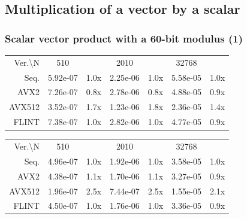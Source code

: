 \documentclass[10pt]{beamer}
\begin{document}
\subsection{Multiplication of a vector by a scalar}
\begin{frame}
    \frametitle{Scalar vector product with a 60-bit modulus (1)}

    \begin{table}[h!]
        \centering
        
        \begin{tabular}{|r|*{3}{c c|}}
            \hline
            \rowcolor{myGray} 
            \multicolumn{7}{|c|}{\textsc{Cascade Lake}} \\
    
            \hline
            \rowcolor{myGray}
            Ver.\textbackslash N & 510 & & 2010 & & 32768 & \\
            \hline
            \cellcolor{myGray} Seq. & 5.92e-07 & 1.0x & 2.25e-06 & 1.0x & 5.58e-05 & 1.0x \\
            \hline
            \cellcolor{myGray} AVX2 & 7.26e-07 & 0.8x & 2.78e-06 & 0.8x & 4.88e-05 & 0.9x \\
            \hline
            \cellcolor{myGray} AVX512 & 3.52e-07 & 1.7x & 1.23e-06 & 1.8x & 2.36e-05 & 1.4x \\
            \hline
            \cellcolor{myGray} FLINT & 7.38e-07 & 1.0x & 2.82e-06 & 1.0x & 4.77e-05 & 0.9x \\
            \hline
        \end{tabular}
    
        \begin{tabular}{|r|*{3}{c c|}}
            \hline
            \rowcolor{myGray} 
            \multicolumn{7}{|c|}{\textsc{Ice Lake}} \\
    
            \hline
            \rowcolor{myGray}
            Ver.\textbackslash N & 510 & & 2010 & & 32768 & \\
            \hline
            \cellcolor{myGray} Seq. & 4.96e-07 & 1.0x & 1.92e-06 & 1.0x & 3.58e-05 & 1.0x \\
            \hline
            \cellcolor{myGray} AVX2 & 4.38e-07 & 1.1x & 1.70e-06 & 1.1x & 3.27e-05 & 0.9x \\
            \hline
            \cellcolor{myGray} AVX512 & 1.96e-07 & 2.5x & 7.44e-07 & 2.5x & 1.55e-05 & 2.1x \\
            \hline
            \cellcolor{myGray} FLINT & 4.50e-07 & 1.0x & 1.76e-06 & 1.0x & 3.36e-05 & 0.9x \\
            \hline
        \end{tabular}
    

\end{table}
\end{frame}
\end{document}
